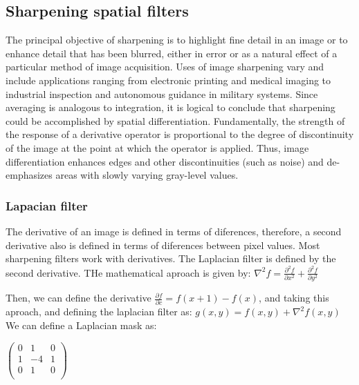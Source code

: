 \documentclass[a4paper]{article}
\begin{document}
\subsection{Sharpening spatial filters}
The principal objective of sharpening is to highlight fine detail in an image or to enhance detail that has been blurred, either in error or as a natural effect of a particular method of image acquisition. Uses of image sharpening vary and include applications ranging from electronic printing and medical imaging to industrial inspection and autonomous guidance in military systems.
Since averaging is analogous to integration, it is logical to conclude that sharpening could be accomplished by spatial differentiation. Fundamentally, the strength of the response of a derivative operator is proportional to the degree of discontinuity of the image at the point at which the operator is applied. Thus, image differentiation enhances edges and other discontinuities (such as noise) and de-emphasizes areas with slowly varying gray-level values.

\subsubsection{Lapacian filter}
The derivative of an image is defined in terms of diferences, therefore, a second derivative also is defined in terms of diferences between pixel values. Most sharpening filters work with derivatives. The Laplacian filter is defined by the second derivative. THe mathematical aproach is given by:
\begin{math}
\nabla^2 f = \frac{\partial^2 f}{\partial x^2} + \frac{\partial^2 f}{\partial y^2} 
\end{math}

Then, we can define the derivative $\frac{\partial f}{\partial c} = f(x+1) -f(x) $, and taking this aproach, and defining the laplacian filter as:
\begin{math}
g(x,y) = f(x,y) + \nabla^2f(x,y)
\end{math}
\\
We can define a Laplacian mask as: 
\begin{center}
\begin{math}
   \begin{pmatrix} 
   0 & 1 & 0 \\ 
   1 & -4 & 1 \\
   0 & 1 & 0 \\ 
   \end{pmatrix}
\end{math}
\end{center}
\end{document}
